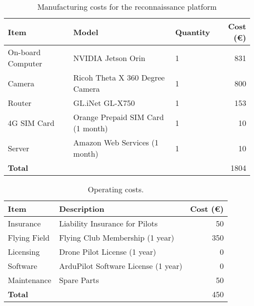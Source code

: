 \begin{table}[H]
  \begin{tabular}{ l l l r }
    \toprule
    \textbf{Item} & \textbf{Model} & \textbf{Quantity} & \textbf{Cost (\euro)} \\
    \midrule
    On-board Computer & NVIDIA Jetson Orin \autocite{nvidiaNVIDIAJetson} & 1 & 831 \\
    Camera & Ricoh Theta X 360 Degree Camera \autocite{ricohimagingTHETARicoh} & 1 & 800 \\
    Router & GL.iNet GL-X750 \autocite{glinetGLX750Spitz} & 1 & 153  \\
    4G SIM Card & Orange Prepaid SIM Card (1 month) & 1 & 10 \\
    Server & Amazon Web Services (1 month) & 1 & 10 \\
    \midrule
    \textbf{Total} & & & 1804 \\
    \bottomrule
  \end{tabular}
  \caption{Manufacturing costs for the reconnaissance platform} \label{tab:manufacturing_costs_reconnaissance_platform}
\end{table}

\begin{table}[H]
    \begin{tabular}{ l l r }
        \toprule
        \textbf{Item} & \textbf{Description} & \textbf{Cost (\euro)} \\
        \midrule
        Insurance & Liability Insurance for Pilots & 50 \\
        Flying Field & Flying Club Membership (1 year) & 350 \\
        Licensing & Drone Pilot License (1 year) & 0 \\
        Software & ArduPilot Software License (1 year) & 0 \\
        Maintenance & Spare Parts & 50 \\
        \midrule
        \textbf{Total} & & 450 \\
        \bottomrule
    \end{tabular}
    \caption{Operating costs.}\label{tab:operating_costs}
\end{table}

